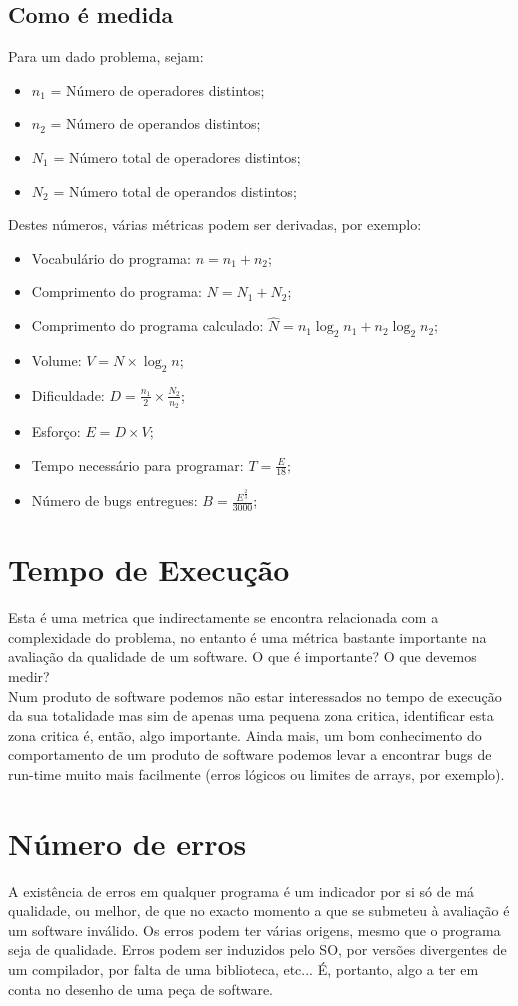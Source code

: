 \documentclass[a4paper,10pt,openright,openbib,twocolumn]{article}
\begin{document}
\subsection{Como é medida}
Para um dado problema, sejam:
\begin{itemize}
	\item $n_1$ = Número de operadores distintos;
	\item $n_2$ = Número de operandos distintos;
	\item $N_1$ = Número total de operadores distintos;
	\item $N_2$ = Número total de operandos distintos;
\end{itemize}
Destes números, várias métricas podem ser derivadas, por exemplo:
\begin{itemize}
	\item Vocabulário do programa: $n = n_1 + n_2$;
	\item Comprimento do programa: $N = N_1 + N_2$;
	\item Comprimento do programa calculado: $\widehat{N} = n_1 \log_2{n_1} + n_2 \log_2{n_2}$;
	\item Volume: $V = N \times \log_2{n}$;
	\item Dificuldade: $D = \frac{n_1}{2} \times \frac{N_2}{n_2}$;
	\item Esforço: $E = D \times V$;
	\item Tempo necessário para programar: $T = \frac{E}{18}$;
	\item Número de bugs entregues: $B = \frac{E^{\frac{2}{3}}}{3000}$;
\end{itemize}
\section{Tempo de Execução}
Esta é uma metrica que indirectamente se encontra relacionada com a complexidade do problema, no entanto é uma métrica bastante importante na avaliação da qualidade de um software. O que é importante? O que devemos medir? \\
Num produto de software podemos não estar interessados no tempo de execução da sua totalidade mas sim de apenas uma pequena zona critica, identificar esta zona critica é, então, algo importante. Ainda mais, um bom conhecimento do comportamento de um produto de software podemos levar a encontrar bugs de run-time muito mais facilmente (erros lógicos ou limites de arrays, por exemplo). 

\section{Número de erros}
A existência de erros em qualquer programa é um indicador por si só de má qualidade, ou melhor, de que no exacto momento a que se submeteu à avaliação é um software inválido. Os erros podem ter várias origens, mesmo que o programa seja de qualidade. Erros podem ser induzidos pelo SO, por versões divergentes de um compilador, por falta de uma biblioteca, etc...
É, portanto, algo a ter em conta no desenho de uma peça de software. 
\end{document}
